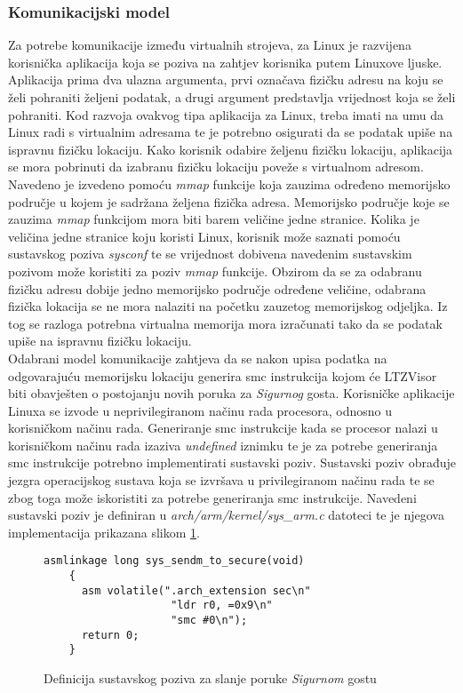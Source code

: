 \documentclass[times, utf8, diplomski, numeric]{fer}
\begin{document}
\subsubsection{Komunikacijski model}
Za potrebe komunikacije između virtualnih strojeva, za Linux je razvijena korisnička aplikacija koja se poziva na zahtjev
korisnika putem Linuxove ljuske. Aplikacija prima dva ulazna argumenta, prvi označava fizičku adresu na koju se želi
pohraniti željeni podatak, a drugi argument predstavlja vrijednost koja se želi pohraniti. Kod razvoja ovakvog tipa aplikacija
za Linux, treba imati na umu da Linux radi s virtualnim adresama te je potrebno osigurati da se podatak upiše na ispravnu
fizičku lokaciju. Kako korisnik odabire željenu fizičku lokaciju, aplikacija se mora pobrinuti da izabranu fizičku lokaciju
poveže s virtualnom adresom. Navedeno je izvedeno pomoću \textit{mmap} funkcije koja zauzima određeno memorijsko područje u
kojem je sadržana željena fizička adresa. Memorijsko područje koje se zauzima \textit{mmap} funkcijom mora biti barem
veličine jedne stranice. Kolika je veličina jedne stranice koju koristi Linux, korisnik može saznati pomoću sustavskog
poziva \textit{sysconf} te se vrijednost dobivena navedenim sustavskim pozivom može koristiti za poziv \textit{mmap}
funkcije. Obzirom da se za odabranu fizičku adresu dobije jedno memorijsko područje određene veličine, odabrana fizička
lokacija se ne mora nalaziti na početku zauzetog memorijskog odjeljka. Iz tog se razloga potrebna virtualna memorija mora
izračunati tako da se podatak upiše na ispravnu fizičku lokaciju.\\
Odabrani model komunikacije zahtjeva da se nakon upisa podatka na odgovarajuću memorijsku lokaciju generira \gls{smc} instrukcija
kojom će LTZVisor biti obavješten o postojanju novih poruka za \textit{Sigurnog} gosta. Korisničke aplikacije Linuxa
se izvode u neprivilegiranom načinu rada procesora, odnosno u korisničkom načinu rada. Generiranje \gls{smc} instrukcije kada
se procesor nalazi u korisničkom načinu rada izaziva \textit{undefined} iznimku te je za potrebe generiranja \gls{smc}
instrukcije potrebno implementirati sustavski poziv. Sustavski poziv obrađuje jezgra operacijskog sustava koja se izvršava
u privilegiranom načinu rada te se zbog toga može iskoristiti za potrebe generiranja \gls{smc} instrukcije. Navedeni sustavski
poziv je definiran u \textit{arch/arm/kernel/sys\_arm.c} datoteci te je njegova implementacija prikazana slikom \ref{sendm}.

\begin{figure}[H]
  \lstset{numbers=left, numbersep=2pt, numberstyle=\tiny, breaklines=true, xleftmargin=.1\textwidth}
  \begin{lstlisting}[showstringspaces=false]
    asmlinkage long sys_sendm_to_secure(void)
    {
      asm volatile(".arch_extension sec\n"
                    "ldr r0, =0x9\n"
                    "smc #0\n");
      return 0;
    }
  \end{lstlisting}
  \caption{Definicija sustavskog poziva za slanje poruke \textit{Sigurnom} gostu}
  \label{sendm}
\end{figure}
\end{document}

